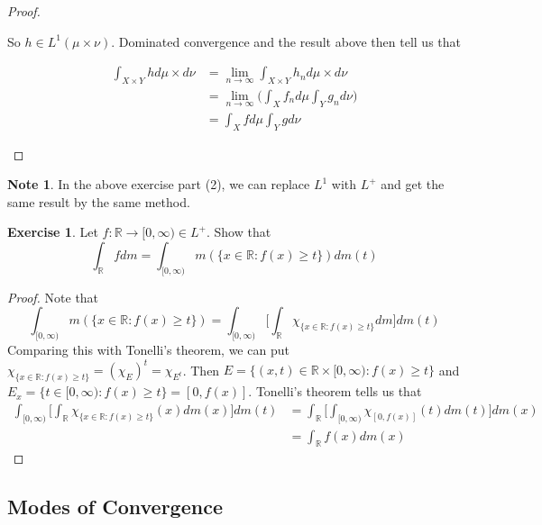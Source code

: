 \documentclass[12pt]{amsart}
\theoremstyle{definition}
\newtheorem{note}[definition]{Note}
\newtheorem{ex}[definition]{Exercise}
\newcommand{\R}{\mathbb{R}}
\newcommand{\Rg}{[0,\infty)}
\newcommand{\limn}{\lim \limits_{n \rightarrow \infty}}
\newcommand{\lex}[1]{\label{ex:#1}}
\begin{document}
\begin{proof}
\begin{enumerate}
			So $h \in L^1(\mu \times \nu)$. Dominated convergence and the result above then tell us that 
			
			\begin{align*}
				\int_{X \times Y} h d\mu \times d\nu 
				&= \limn \int_{X \times Y} h_n d\mu \times d\nu \\
				&= \limn \bigg( \int_X f_n d\mu \int_Y g_n d\nu \bigg)\\
				&= \int_X f d\mu \int_Y g d\nu
			\end{align*}
			
		\end{enumerate}
	\end{proof}
	
	\begin{note}
		In the above exercise part (2), we can replace $L^1$ with $L^+$ and get the same result by the same method.
	\end{note}
	
	\begin{ex} \lex{00000} 
		Let $f:\R \rightarrow \Rg \in L^+$. Show that $$\int_{\R}fdm = \int_{\Rg}m(\{x \in \R: f(x) \geq t\}) dm(t)$$
	\end{ex}
	
	\begin{proof}
		Note that $$\int_{\Rg}m(\{x \in \R: f(x) \geq t\}) = \int_{\Rg} \bigg[\int_{\R} \chi_{\{x \in \R: f(x) \geq t\}}dm \bigg]dm(t)$$
		Comparing this with Tonelli's theorem, we can put $\chi_{\{x \in \R: f(x) \geq t\}} = (\chi_{E})^t = \chi_{E^t}$. Then $E = \{(x,t) \in \R \times \Rg: f(x) \geq t\}$ and $E_x = \{t \in \Rg: f(x) \geq t\} = [0,f(x)]$. Tonelli's theorem tells us that 
		\begin{align*}
			\int_{\Rg} \bigg[\int_{\R} \chi_{\{x \in \R: f(x) \geq t\}}(x) dm(x) \bigg]dm(t)
			&= \int_{\R} \bigg[ \int_{\Rg} \chi_{[0,f(x)]}(t) dm(t) \bigg] dm(x)\\
			&= \int_{\R} f(x) dm(x)
		\end{align*} 
	\end{proof}
	
	
	
	
	
	
	
	
	
	
	
	
	
	
	\newpage
	\subsection{Modes of Convergence}
	
\end{document}
